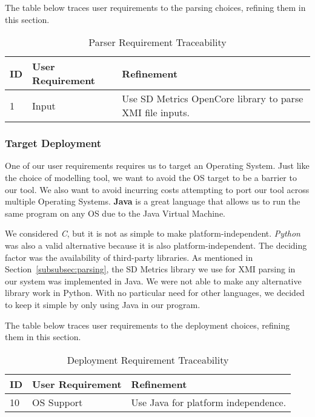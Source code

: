 The table below traces user requirements to the parsing choices, refining them in this section.
\begin{table}[htbp]
    \centering
    \caption{Parser Requirement Traceability}\label{tab:parse-choice-table}
    \begin{tabularx}{\textwidth}{| l | l | X |}
        \hline
        \textbf{ID} & \textbf{User Requirement} & \textbf{Refinement} \\
        \hline
        1 & Input & Use SD Metrics OpenCore library to parse XMI file inputs. \\ \hline
    \end{tabularx}
\end{table}

\newpage
\subsubsection{Target Deployment}
One of our user requirements requires us to target an Operating System.
Just like the choice of modelling tool, we want to avoid the OS target to be a barrier to our tool.
We also want to avoid incurring costs attempting to port our tool across multiple Operating Systems.
\textbf{Java} is a great language that allows us to run the same program on any OS due to the Java Virtual Machine.

We considered \textit{C}, but it is not as simple to make platform-independent.
\textit{Python} was also a valid alternative because it is also platform-independent.
The deciding factor was the availability of third-party libraries.
As mentioned in Section~\ref{subsubsec:parsing}, the SD Metrics library we use for XMI parsing in our system was implemented in Java.
We were not able to make any alternative library work in Python.
With no particular need for other languages, we decided to keep it simple by only using Java in our program.

The table below traces user requirements to the deployment choices, refining them in this section.
\begin{table}[htbp]
    \centering
    \caption{Deployment Requirement Traceability}\label{tab:os-choice-table}
    \begin{tabularx}{\textwidth}{| l | l | X |}
        \hline
        \textbf{ID} & \textbf{User Requirement} & \textbf{Refinement} \\
        \hline
        10 & OS Support & Use Java for platform independence. \\ \hline
    \end{tabularx}
\end{table}

